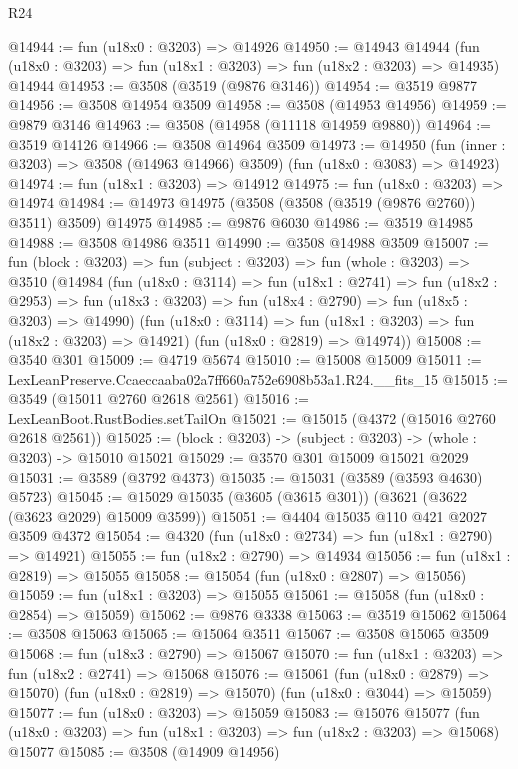 \begin{lexlean}{R24}
\begin{coremodule}
@14944 := fun (u18x0 : @3203) => @14926
@14950 := @14943
    @14944
    (fun (u18x0 : @3203) => fun (u18x1 : @3203) => fun (u18x2 : @3203) => @14935)
    @14944
@14953 := @3508 (@3519 (@9876 @3146))
@14954 := @3519 @9877
@14956 := @3508 @14954 @3509
@14958 := @3508 (@14953 @14956)
@14959 := @9879 @3146
@14963 := @3508 (@14958 (@11118 @14959 @9880))
@14964 := @3519 @14126
@14966 := @3508 @14964 @3509
@14973 := @14950
    (fun (inner : @3203) => @3508 (@14963 @14966) @3509)
    (fun (u18x0 : @3083) => @14923)
@14974 := fun (u18x1 : @3203) => @14912
@14975 := fun (u18x0 : @3203) => @14974
@14984 := @14973 @14975 (@3508 (@3508 (@3519 (@9876 @2760)) @3511) @3509) @14975
@14985 := @9876 @6030
@14986 := @3519 @14985
@14988 := @3508 @14986 @3511
@14990 := @3508 @14988 @3509
@15007 := fun (block : @3203) =>
  fun (subject : @3203) =>
  fun (whole : @3203) =>
  @3510
    (@14984
      (fun (u18x0 : @3114) =>
      fun (u18x1 : @2741) =>
      fun (u18x2 : @2953) =>
      fun (u18x3 : @3203) => fun (u18x4 : @2790) => fun (u18x5 : @3203) => @14990)
      (fun (u18x0 : @3114) => fun (u18x1 : @3203) => fun (u18x2 : @3203) => @14921)
      (fun (u18x0 : @2819) => @14974))
@15008 := @3540 @301
@15009 := @4719 @5674
@15010 := @15008 @15009
@15011 := LexLeanPreserve.Ccaeccaaba02a7ff660a752e6908b53a1.R24.__fits_15
@15015 := @3549 (@15011 @2760 @2618 @2561)
@15016 := LexLeanBoot.RustBodies.setTailOn
@15021 := @15015 (@4372 (@15016 @2760 @2618 @2561))
@15025 := (block : @3203) -> (subject : @3203) -> (whole : @3203) -> @15010 @15021
@15029 := @3570 @301 @15009 @15021 @2029
@15031 := @3589 (@3792 @4373)
@15035 := @15031 (@3589 (@3593 @4630) @5723)
@15045 := @15029 @15035 (@3605 (@3615 @301)) (@3621 (@3622 (@3623 @2029) @15009 @3599))
@15051 := @4404 @15035 @110 @421 @2027 @3509 @4372
@15054 := @4320 (fun (u18x0 : @2734) => fun (u18x1 : @2790) => @14921)
@15055 := fun (u18x2 : @2790) => @14934
@15056 := fun (u18x1 : @2819) => @15055
@15058 := @15054 (fun (u18x0 : @2807) => @15056)
@15059 := fun (u18x1 : @3203) => @15055
@15061 := @15058 (fun (u18x0 : @2854) => @15059)
@15062 := @9876 @3338
@15063 := @3519 @15062
@15064 := @3508 @15063
@15065 := @15064 @3511
@15067 := @3508 @15065 @3509
@15068 := fun (u18x3 : @2790) => @15067
@15070 := fun (u18x1 : @3203) => fun (u18x2 : @2741) => @15068
@15076 := @15061
    (fun (u18x0 : @2879) => @15070)
    (fun (u18x0 : @2819) => @15070)
    (fun (u18x0 : @3044) => @15059)
@15077 := fun (u18x0 : @3203) => @15059
@15083 := @15076
    @15077
    (fun (u18x0 : @3203) => fun (u18x1 : @3203) => fun (u18x2 : @3203) => @15068)
    @15077
@15085 := @3508 (@14909 @14956)

\end{coremodule}
\end{lexlean}
